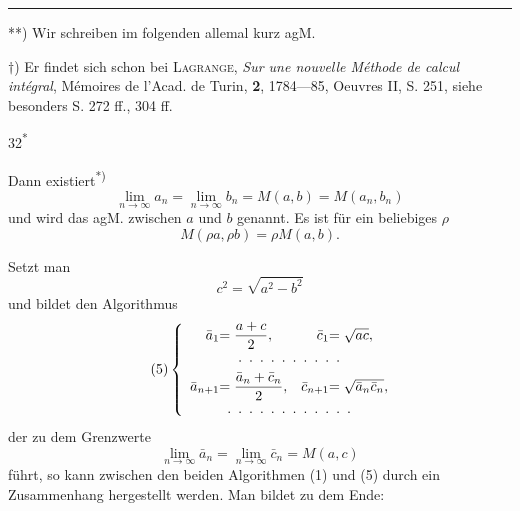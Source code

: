 \vfill
\par\smallskip\noindent\rule{.25\linewidth}{.4pt}\par
{\small
\par\indent ***) Wir schreiben im folgenden allemal kurz agM.
\par\indent $\dagger$) Er findet sich schon bei \textsc{Lagrange}, \textit{Sur une nouvelle Méthode de calcul intégral}, Mémoires de l’Acad. de Turin, \textbf{2}, 1784—85, Oeuvres II, S. 251, siehe besonders S. 272 ff., 304 ff.
\par}
\begin{flushright}32\textsuperscript{*}\end{flushright}
\clearpage
{}
\noindent Dann existiert\textsuperscript{*)}
\begin{equation*}\tag*{(2)}
\lim_{n\to\infty}a_n=\lim_{n\to\infty}b_n=M(a,b)=M(a_n,b_n)
\end{equation*}
\noindent und wird das agM. zwischen $a$ und $b$ genannt. Es ist für ein beliebiges $\rho$
\begin{equation*}\tag*{(3)}M(\rho a,\rho b)=\rho M(a,b).\end{equation*}
\par\indent Setzt man
\begin{equation*}\tag*{(4)}c^2=\sqrt{a^2-b^2}\end{equation*}
\noindent und bildet den Algorithmus
\begin{equation*}\tag*{(5)}
\left\{\begin{array}{r@{}l@{\quad}r@{}l}
\bar a_1&=\dfrac{a+c}{2},& \bar c_1&=\sqrt{ac},\\[4pt]
\multicolumn{4}{c}{.\enspace.\enspace.\enspace.\enspace.\enspace.\enspace.\enspace.\enspace.\enspace.}\\[4pt]
\bar a_{n+1}&=\dfrac{\bar a_n+\bar c_n}{2},&\bar c_{n+1}&=\sqrt{\bar a_n\bar c_n},\\[4pt]
\multicolumn{4}{c}{.\enspace.\enspace.\enspace.\enspace.\enspace.\enspace.\enspace.\enspace.\enspace.\enspace.\enspace.}
\end{array}\right.
\end{equation*}
\noindent der zu dem Grenzwerte
\begin{equation*}\tag*{(6)}\lim_{n\to\infty}\bar a_n=\lim_{n\to\infty}\bar c_n=M(a,c)\end{equation*}
\noindent führt, so kann zwischen den beiden Algorithmen (1) und (5) durch  ein Zusammenhang hergestellt werden. Man bildet zu dem Ende:
